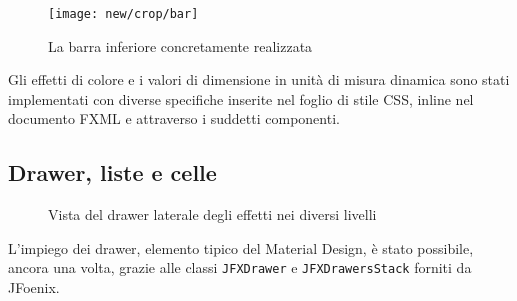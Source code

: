             \begin{figure}[htbp]
                \centering
                \texttt{[image: new/crop/bar]}
                \caption{La barra inferiore concretamente realizzata}
                \label{fig:newBar}
            \end{figure}

            Gli effetti di colore e i valori di dimensione in unità di misura dinamica sono stati implementati con diverse specifiche inserite nel foglio di stile CSS, inline nel documento FXML e attraverso i suddetti componenti.

        \subsection{Drawer, liste e celle}\label{subsec:drawerCelle}
            \begin{figure}[htbp]
                \centering%
                \qquad{\LARGE$\Rightarrow$}\qquad
                \qquad{\LARGE$\Rightarrow$}\qquad
                \caption{Vista del drawer laterale degli effetti nei diversi livelli\label{fig:impl:allEffects}}
            \end{figure}

            L'impiego dei drawer, elemento tipico del Material Design, è stato possibile, ancora una volta, grazie alle classi \texttt{JFXDrawer} e \texttt{JFXDrawersStack} forniti da JFoenix.

